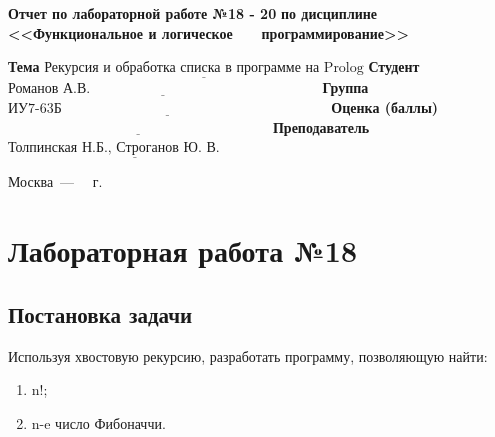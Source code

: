 \documentclass[12pt]{report}
\begin{document}
\begin{titlepage}
		\begin{center}
			\noindent\begin{minipage}{1.1\textwidth}\centering
				\Large\textbf{  Отчет по лабораторной работе №18 - 20}\newline
				\textbf{по дисциплине <<Функциональное и логическое}\newline
				\textbf{~~~программирование>>}\newline\newline
			\end{minipage}
		\end{center}
		
		\noindent\textbf{Тема} $\underline{\text{Рекурсия и обработка списка в программе на Prolog}}$\newline\newline
		\noindent\textbf{Студент} $\underline{\text{Романов А.В.~~~~~~~~~~~~~~~~~~~~~~~~~~~~~~~~~~~~~~~~~~~~~~~~~}}$\newline\newline
		\noindent\textbf{Группа} $\underline{\text{ИУ7-63Б~~~~~~~~~~~~~~~~~~~~~~~~~~~~~~~~~~~~~~~~~~~~~~~~~~~~~~~~~}}$\newline\newline
		\noindent\textbf{Оценка (баллы)} $\underline{\text{~~~~~~~~~~~~~~~~~~~~~~~~~~~~~~~~~~~~~~~~~~~~~~~~~~~~~~~~}}$\newline\newline
		\noindent\textbf{Преподаватель} $\underline{\text{Толпинская Н.Б., Строганов Ю. В.~~~~~~~~~}}$\newline\newline\newline
		
		\begin{center}
			\vfill
			Москва~---~\the\year
			~г.
		\end{center}
	\end{titlepage}
	

\chapter*{Лабораторная работа №18}
\section*{Постановка задачи}
Используя хвостовую рекурсию, разработать программу, позволяющую найти:

\begin{enumerate}
	\item n!;
	\item n-e число Фибоначчи.
\end{enumerate}
\end{document}
